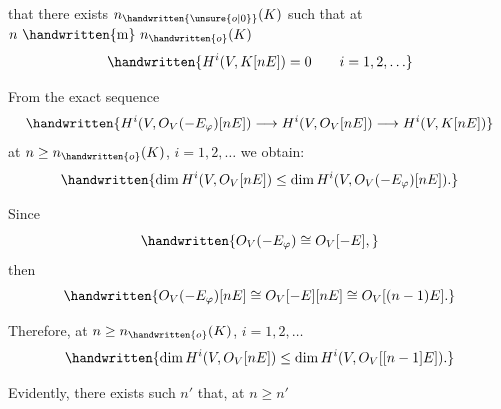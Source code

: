 that there exists $n_{\handwritten{\unsure{o|0}}}(K)$ such that at $n\ \handwritten{\mathrm{m}}\ n_{\handwritten{o}}(K)$
\[
\handwritten{H^i(V,K[nE])=0\qquad i=1,2,\ldots}
\]

From the exact sequence
\[
\handwritten{H^i(V,O_V(-E_\varphi)[nE])\longrightarrow H^i(V,O_V[nE])\longrightarrow H^i(V,K[nE])}
\]
at $n\geq n_{\handwritten{o}}(K)$, $i=1,2,\ldots$ we obtain:
\[
\handwritten{\dim H^i(V,O_V[nE])\leq\dim H^i(V,O_V(-E_\varphi)[nE]).}
\]

Since
\[
\handwritten{O_V(-E_\varphi)\cong O_V[-E],}
\]
then
\[
\handwritten{O_V(-E_\varphi)[nE]\cong O_V[-E][nE]\cong O_V[(n-1)E].}
\]

Therefore, at $n\geq n_{\handwritten{o}}(K)$, $i=1,2,\ldots$
\[
\handwritten{\dim H^i(V,O_V[nE])\leq\dim H^i(V,O_V[[n-1]E]).}
\]

Evidently, there exists such $n'$ that, at $n\geq n'$
